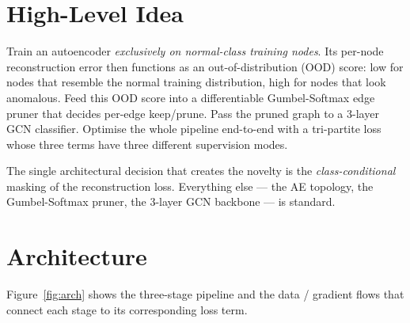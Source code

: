 \documentclass[11pt,a4paper]{report}
\theoremstyle{definition}
\theoremstyle{remark}
\begin{document}
\section{High-Level Idea}

Train an autoencoder \emph{exclusively on normal-class training nodes}.
Its per-node reconstruction error then functions as an out-of-distribution
(OOD) score: low for nodes that resemble the normal training distribution,
high for nodes that look anomalous. Feed this OOD score into a
differentiable Gumbel-Softmax edge pruner that decides per-edge
keep/prune. Pass the pruned graph to a 3-layer GCN classifier.
Optimise the whole pipeline end-to-end with a tri-partite loss whose
three terms have three different supervision modes.

The single architectural decision that creates the novelty is the
\emph{class-conditional} masking of the reconstruction loss. Everything
else --- the AE topology, the Gumbel-Softmax pruner, the 3-layer GCN
backbone --- is standard.

\section{Architecture}

Figure~\ref{fig:arch} shows the three-stage pipeline and the data /
gradient flows that connect each stage to its corresponding loss term.
\end{document}
